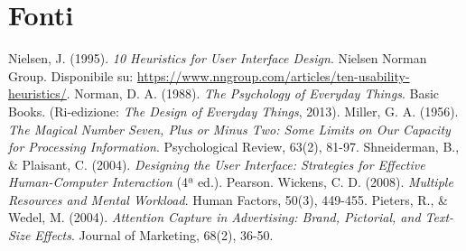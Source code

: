 \chapter{Fonti}
\begin{thebibliography}{9}
     Nielsen, J. (1995). \textit{10 Heuristics for User Interface Design}. Nielsen Norman Group. Disponibile su: \url{https://www.nngroup.com/articles/ten-usability-heuristics/}.
     Norman, D. A. (1988). \textit{The Psychology of Everyday Things}. Basic Books. (Ri-edizione: \textit{The Design of Everyday Things}, 2013).
     Miller, G. A. (1956). \textit{The Magical Number Seven, Plus or Minus Two: Some Limits on Our Capacity for Processing Information}. Psychological Review, 63(2), 81-97.
     Shneiderman, B., \& Plaisant, C. (2004). \textit{Designing the User Interface: Strategies for Effective Human-Computer Interaction} (4ª ed.). Pearson.
     Wickens, C. D. (2008). \textit{Multiple Resources and Mental Workload}. Human Factors, 50(3), 449-455.
     Pieters, R., \& Wedel, M. (2004). \textit{Attention Capture in Advertising: Brand, Pictorial, and Text-Size Effects}. Journal of Marketing, 68(2), 36-50.
\end{thebibliography}